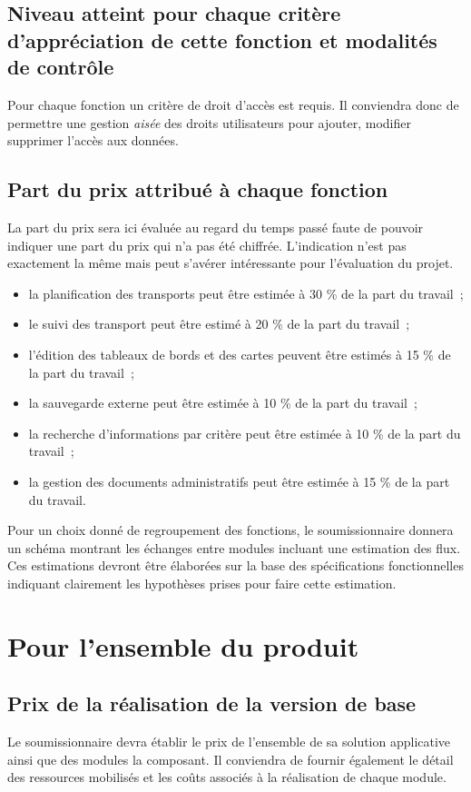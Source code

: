\subsection{Niveau atteint pour chaque critère d'appréciation de cette fonction et modalités de contrôle}
Pour chaque fonction un critère de droit d'accès est requis. Il conviendra donc de permettre une gestion \emph{aisée} des droits utilisateurs pour ajouter, modifier supprimer l'accès aux données.

\subsection{Part du prix attribué à chaque fonction}
La part du prix sera ici évaluée au regard du temps passé faute de pouvoir indiquer une part du prix qui n'a pas été chiffrée. L'indication n'est pas exactement la même mais peut s'avérer intéressante pour l'évaluation du projet. 
\begin{itemize}
 \item la planification des transports peut être estimée à 30 \% de la part du travail~;
 \item le suivi des transport peut être estimé à 20 \% de la part du travail~;
 \item l'édition des tableaux de bords et des cartes peuvent être estimés à 15 \% de la part du travail~;
 \item la sauvegarde externe peut être estimée à 10 \% de la part du travail~;
 \item la recherche d'informations par critère peut être estimée à 10 \% de la part du travail~;
 \item la gestion des documents administratifs peut être estimée à 15 \% de la part du travail.
\end{itemize}
Pour un choix donné de regroupement des fonctions, le soumissionnaire donnera un schéma montrant les échanges entre modules incluant une estimation des flux. Ces estimations devront être élaborées sur la base des spécifications fonctionnelles indiquant clairement les hypothèses prises pour faire cette estimation. 

\section{Pour l'ensemble du produit}

\subsection{Prix de la réalisation de la version de base}
Le soumissionnaire devra établir le prix de l'ensemble de sa solution applicative ainsi que des modules la composant. Il conviendra de fournir également le détail des ressources mobilisés et les coûts associés à la réalisation de chaque module. 

